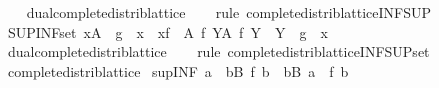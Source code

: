 \begin{isabellebody}
%
\isadelimproof
\ \ %
\endisadelimproof
%
\isatagproof
{}\isamarkupfalse%
\ dual{\isacharunderscore}{\kern0pt}complete{\isacharunderscore}{\kern0pt}distrib{\isacharunderscore}{\kern0pt}lattice\isanewline
\ \ \isamarkupfalse%
\ {\isacharparenleft}{\kern0pt}rule\ complete{\isacharunderscore}{\kern0pt}distrib{\isacharunderscore}{\kern0pt}lattice{\isachardot}{\kern0pt}INF{\isacharunderscore}{\kern0pt}SUP{\isacharparenright}{\kern0pt}%
\endisatagproof
{\isafoldproof}%
%
\isadelimproof
\isanewline
%
\endisadelimproof
\isanewline
{}\isamarkupfalse%
\ SUP{\isacharunderscore}{\kern0pt}INF{\isacharunderscore}{\kern0pt}set{\isacharcolon}{\kern0pt}\ {\isachardoublequoteopen}{\isacharparenleft}{\kern0pt}{\isasymSqunion}x{\isasymin}A{\isachardot}{\kern0pt}\ {\isasymSqinter}\ {\isacharparenleft}{\kern0pt}g\ {\isacharbackquote}{\kern0pt}\ x{\isacharparenright}{\kern0pt}{\isacharparenright}{\kern0pt}\ {\isacharequal}{\kern0pt}\ {\isacharparenleft}{\kern0pt}{\isasymSqinter}x{\isasymin}{\isacharbraceleft}{\kern0pt}f\ {\isacharbackquote}{\kern0pt}\ A\ {\isacharbar}{\kern0pt}f{\isachardot}{\kern0pt}\ {\isasymforall}Y{\isasymin}A{\isachardot}{\kern0pt}\ f\ Y\ {\isasymin}\ Y{\isacharbraceright}{\kern0pt}{\isachardot}{\kern0pt}\ {\isasymSqunion}\ {\isacharparenleft}{\kern0pt}g\ {\isacharbackquote}{\kern0pt}\ x{\isacharparenright}{\kern0pt}{\isacharparenright}{\kern0pt}{\isachardoublequoteclose}\isanewline
%
\isadelimproof
\ \ %
\endisadelimproof
%
\isatagproof
{}\isamarkupfalse%
\ dual{\isacharunderscore}{\kern0pt}complete{\isacharunderscore}{\kern0pt}distrib{\isacharunderscore}{\kern0pt}lattice\isanewline
\ \ \isamarkupfalse%
\ {\isacharparenleft}{\kern0pt}rule\ complete{\isacharunderscore}{\kern0pt}distrib{\isacharunderscore}{\kern0pt}lattice{\isachardot}{\kern0pt}INF{\isacharunderscore}{\kern0pt}SUP{\isacharunderscore}{\kern0pt}set{\isacharparenright}{\kern0pt}%
\endisatagproof
{\isafoldproof}%
%
\isadelimproof
\isanewline
%
\endisadelimproof
\isanewline
{}\isamarkupfalse%
\isanewline
\isanewline
\isanewline
{}\isamarkupfalse%
\ complete{\isacharunderscore}{\kern0pt}distrib{\isacharunderscore}{\kern0pt}lattice\isanewline
{}\isanewline
\isanewline
{}\isamarkupfalse%
\ sup{\isacharunderscore}{\kern0pt}INF{\isacharcolon}{\kern0pt}\ {\isachardoublequoteopen}a\ {\isasymsqunion}\ {\isacharparenleft}{\kern0pt}{\isasymSqinter}b{\isasymin}B{\isachardot}{\kern0pt}\ f\ b{\isacharparenright}{\kern0pt}\ {\isacharequal}{\kern0pt}\ {\isacharparenleft}{\kern0pt}{\isasymSqinter}b{\isasymin}B{\isachardot}{\kern0pt}\ a\ {\isasymsqunion}\ f\ b{\isacharparenright}{\kern0pt}{\isachardoublequoteclose}\isanewline

\end{isabellebody}
